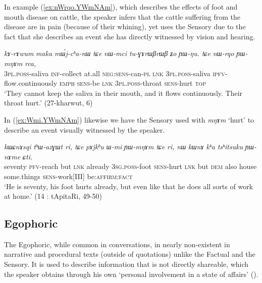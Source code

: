 \documentclass[oldfontcommands,oneside,a4paper,11pt]{article}
\newcommand{\ipa}[1]{{\phon\textit{#1}}} %
\newcommand{\refb}[1]{(\ref{#1})}
\newcommand{\factual}[1]{\textsc{:fact}}
\begin{document}
In example \refb{ex:nWrqo.YWmNAm}, which describes the effects of foot and mouth disease on cattle, the speaker  infers that the cattle suffering from the disease are in pain (because of their whining), yet uses the Sensory due to the fact that she describes an event she has directly witnessed by vision and hearing. 

\begin{exe}
\ex \label{ex:nWrqo.YWmNAm}
\gll \ipa{nɯ-mci} 	\ipa{kɤ-rɤwum} 	\ipa{maka} 	\ipa{mɯ́j-cʰa-nɯ} 	\ipa{tɕe} 	\ipa{nɯ-mci} 	\ipa{tu-ɣɤrɯβrɯβ} 	\ipa{ʑo} 	\ipa{ɲɯ-ŋu.}  
\ipa{tɕe} 	\ipa{nɯ-rqo} 	\ipa{ɲɯ-mŋɤm} 	\ipa{rca,} \\
\textsc{3pl.poss}-saliva \textsc{inf}-collect at.all \textsc{neg:sens}-can-\textsc{pl} \textsc{lnk} \textsc{3pl.poss}-saliva \textsc{ipfv}-flow.continuously \textsc{emph} \textsc{sens}-be \textsc{lnk} \textsc{3pl.poss}-throat \textsc{sens}-hurt \textsc{top}  \\
\glt `They cannot keep the saliva in their mouth, and it flows continuously. Their throat hurt.' (27-kharwut, 6)
\end{exe}

In \refb{ex:Wmi.YWmNAm} likewise we have the Sensory used with \ipa{mŋɤm} `hurt' to describe an event visually witnessed by the speaker.

\begin{exe}
\ex \label{ex:Wmi.YWmNAm}
\gll
\ipa{kɯɕnɤsqi} 	\ipa{tʰɯ-azɣɯt} 	\ipa{ri,} \ipa{tɕe} 	\ipa{pɤjkʰu} 	\ipa{ɯ-mi} 	\ipa{ɲɯ-mŋɤm} 	\ipa{tɕe} 	\ipa{ri,} 	\ipa{nɯ} 	\ipa{kɯnɤ} 	\ipa{kʰa} 	\ipa{tsʰitsuku} 	\ipa{ɲɯ-nɤme} 	\ipa{ɕti.} \\
seventy \textsc{pfv}-reach but \textsc{lnk} already \textsc{3sg.poss}-foot \textsc{sens}-hurt \textsc{lnk} but \textsc{dem} also house some.things \textsc{sens}-work[III] be:\textsc{affirm}\factual{} \\
\glt `He is seventy, his foot hurts already, but even like that he does all sorts of work at home.' (14 : tApitaRi, 49-50)
\end{exe}

\subsection{Egophoric} \label{sec:egophoric}
The Egophoric, while common in conversations, in nearly non-existent in narrative and procedural texts (outside of quotations) unlike the Factual and the Sensory. It is used to describe information that is not directly shareable, which the speaker obtains through his own `personal involvement in a state of affairs' (\citealt{floyd16egophoricity}). 
\end{document}
